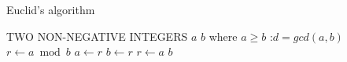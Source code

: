 \documentclass{article}
\begin{document}
\begin{algorithm}
\caption{Euclid's algorithm}
\label{euclid}
\begin{algorithmic}[1]%
\REQUIRE TWO NON-NEGATIVE INTEGERS $a$ $b$ where $a \geq b$
\ENSURE:$d = gcd(a,b)$
\STATE $r \gets a \bmod b$
\STATE$a \gets r$
\STATE$b \gets r$
\STATE$r \gets a$
\ENDWHILE
\RETURN$b$
\end{algorithmic}
\end{algorithm}
\end{document}
